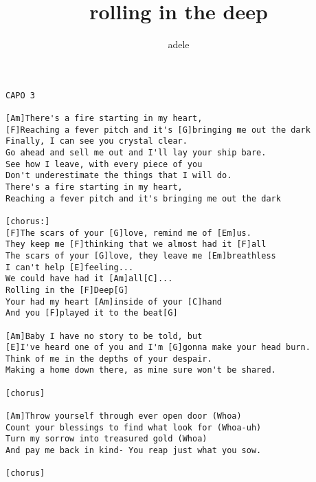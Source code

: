 \author{adele}
\title{rolling in the deep}
\maketitle
\begin{verbatim}
CAPO 3

[Am]There's a fire starting in my heart,
[F]Reaching a fever pitch and it's [G]bringing me out the dark
Finally, I can see you crystal clear.
Go ahead and sell me out and I'll lay your ship bare.
See how I leave, with every piece of you
Don't underestimate the things that I will do.
There's a fire starting in my heart,
Reaching a fever pitch and it's bringing me out the dark

[chorus:]
[F]The scars of your [G]love, remind me of [Em]us.
They keep me [F]thinking that we almost had it [F]all
The scars of your [G]love, they leave me [Em]breathless
I can't help [E]feeling... 
We could have had it [Am]all[C]...
Rolling in the [F]Deep[G]
Your had my heart [Am]inside of your [C]hand
And you [F]played it to the beat[G]

[Am]Baby I have no story to be told, but
[E]I've heard one of you and I'm [G]gonna make your head burn.
Think of me in the depths of your despair.
Making a home down there, as mine sure won't be shared.

[chorus]

[Am]Throw yourself through ever open door (Whoa)
Count your blessings to find what look for (Whoa-uh)
Turn my sorrow into treasured gold (Whoa)
And pay me back in kind- You reap just what you sow.

[chorus]
\end{verbatim}